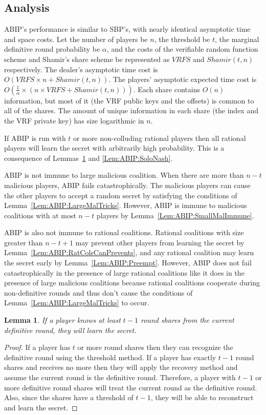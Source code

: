 \documentclass{dalcsthesis}
\newtheorem{lemma}{Lemma}
\begin{document}
\subsection{Analysis}

ABIP's performance is similar to SBP's, with nearly identical asymptotic time and space costs. Let the number of players be $n$, the threshold be $t$, the marginal definitive round probability be $\alpha$, and the costs of the verifiable random function scheme and Shamir's share scheme be represented as $VRFS$ and $Shamir(t, n)$ respectively. The dealer's asymptotic time cost is $O(VRFS \times n + Shamir(t, n))$. The players' asymptotic expected time cost is $O(\frac{1}{\alpha} \times (n \times VRFS + Shamir(t, n)))$. Each share contains $O(n)$ information, but most of it (the VRF public keys and the offsets) is common to all of the shares. The amount of unique information in each share (the index and the VRF private key) has size logarithmic in $n$.

If ABIP is run with $t$ or more non-colluding rational players then all rational players will learn the secret with arbitrarily high probability. This is a consequence of Lemmas~\ref{Lem:ABIP:t-1Def_Sufficient} and \ref{Lem:ABIP:SoloNash}.  

ABIP is not immune to large malicious coalition. When there are more than $n-t$ malicious players, ABIP fails catastrophically. The malicious players can cause the other players to accept a random secret by satisfying the conditions of Lemma~\ref{Lem:ABIP:LargeMalTricks}. However, ABIP is immune to malicious coalitions with at most $n-t$ players by Lemma~\ref{Lem:ABIP:SmallMalImmune}.

ABIP is also not immune to rational coalitions. Rational coalitions with size greater than $n-t+1$ may prevent other players from learning the secret by Lemma~\ref{Lem:ABIP:RatColsCanPrevents}, and any rational coalition may learn the secret early by Lemma~\ref{Lem:ABIP:Preempt}. However, ABIP does not fail catastrophically in the presence of large rational coalitions like it does in the presence of large malicious coalitions because rational coalitions cooperate during non-definitive rounds and thus don't cause the conditions of Lemma~\ref{Lem:ABIP:LargeMalTricks} to occur.

\begin{lemma}\label{Lem:ABIP:t-1Def_Sufficient}If a player knows at least $t-1$ round shares from the current definitive round, they will learn the secret.\end{lemma}
\begin{proof}
If a player has $t$ or more round shares then they can recognize the definitive round using the threshold method. If a player has exactly $t-1$ round shares and receives no more then they will apply the recovery method and assume the current round is the definitive round. Therefore, a player with $t-1$ or more definitive round shares will treat the current round as the definitive round. Also, since the shares have a threshold of $t-1$, they will be able to reconstruct and learn the secret.
\end{proof}
\end{document}
